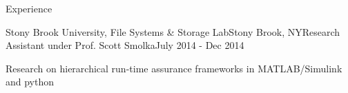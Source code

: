 \documentclass{resume} %
\begin{document}
\begin{rSection}{Experience}

\begin{rSubsection}{Stony Brook University, File Systems \& Storage Lab}{Stony Brook, NY}{Research Assistant under Prof. Scott Smolka}{July 2014 - Dec 2014}
\item Research on hierarchical run-time assurance frameworks in MATLAB/Simulink and python
\end{rSubsection}

\end{rSection}
\end{document}

